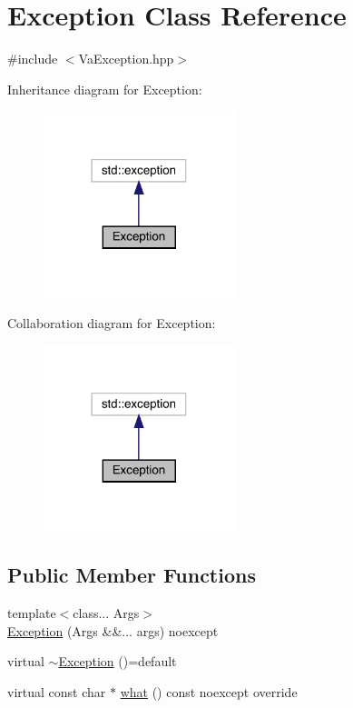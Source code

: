 \hypertarget{class_exception}{}\section{Exception Class Reference}
\label{class_exception}


{\ttfamily \#include $<$Va\+Exception.\+hpp$>$}



Inheritance diagram for Exception\+:\nopagebreak
\begin{figure}[H]
\begin{center}
\leavevmode
\includegraphics[width=158pt]{class_exception__inherit__graph}
\end{center}
\end{figure}


Collaboration diagram for Exception\+:\nopagebreak
\begin{figure}[H]
\begin{center}
\leavevmode
\includegraphics[width=158pt]{class_exception__coll__graph}
\end{center}
\end{figure}
\subsection*{Public Member Functions}
\begin{DoxyCompactItemize}
\item 
{\footnotesize template$<$class... Args$>$ }\\\hyperlink{class_exception_a189e31fab4de04b25de0db5a09aa42b4}{Exception} (Args \&\&... args) noexcept
\item 
virtual \hyperlink{class_exception_a5c134c74b84c0a7a4c106ac60cabe10c}{$\sim$\+Exception} ()=default
\item 
virtual const char $\ast$ \hyperlink{class_exception_a91eace2bc486fa18d3f913a28f3921f8}{what} () const noexcept override
\end{DoxyCompactItemize}


